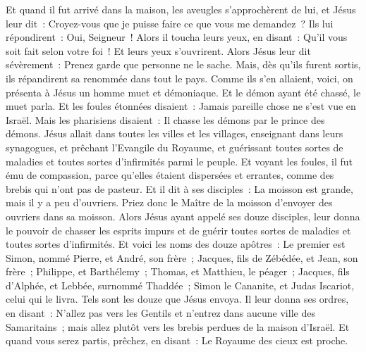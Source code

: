 \begin{multicols}{2}
Et quand il fut arrivé dans la maison, les aveugles s'approchèrent de lui, et Jésus leur dit~: Croyez-vous que je puisse faire ce que vous me demandez~? Ils lui répondirent~: Oui, Seigneur~!
Alors il toucha leurs yeux, en disant~: Qu'il vous soit fait selon votre foi~!
Et leurs yeux s'ouvrirent. Alors Jésus leur dit sévèrement~: Prenez garde que personne ne le sache.
Mais, dès qu'ils furent sortis, ils répandirent sa renommée dans tout le pays.
Comme ils s'en allaient, voici, on présenta à Jésus un homme muet et démoniaque.
Et le démon ayant été chassé, le muet parla. Et les foules étonnées disaient~: Jamais pareille chose ne s'est vue en Israël.
Mais les pharisiens disaient~: Il chasse les démons par le prince des démons.
Jésus allait dans toutes les villes et les villages, enseignant dans leurs synagogues, et prêchant l'Evangile du Royaume, et guérissant toutes sortes de maladies et toutes sortes d'infirmités parmi le peuple.
Et voyant les foules, il fut ému de compassion, parce qu'elles étaient dispersées et errantes, comme des brebis qui n'ont pas de pasteur.
Et il dit à ses disciples~: La moisson est grande, mais il y a peu d'ouvriers.
Priez donc le Maître de la moisson d'envoyer des ouvriers dans sa moisson.
\VerseOne{}Alors Jésus ayant appelé ses douze disciples, leur donna le pouvoir de chasser les esprits impurs et de guérir toutes sortes de maladies et toutes sortes d'infirmités.
Et voici les noms des douze apôtres~: Le premier est Simon, nommé Pierre, et André, son frère~; Jacques, fils de Zébédée, et Jean, son frère~;
Philippe, et Barthélemy~; Thomas, et Matthieu, le péager~; Jacques, fils d'Alphée, et Lebbée, surnommé Thaddée~;
Simon le Cananite, et Judas Iscariot, celui qui le livra.
Tels sont les douze que Jésus envoya. Il leur donna ses ordres, en disant~: N'allez pas vers les Gentils et n'entrez dans aucune ville des Samaritains~;
mais allez plutôt vers les brebis perdues de la maison d'Israël.
Et quand vous serez partis, prêchez, en disant~: Le Royaume des cieux est proche.

\end{multicols}
